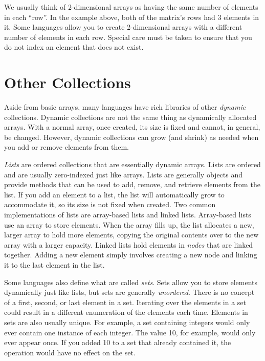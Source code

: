 We usually think of 2-dimensional arrays as having the same number
of elements in each ``row''.  In the example above, both of the matrix's
rows had 3 elements in it.  Some languages allow you to create
2-dimensional arrays with a different number of elements in each
row.  Special care must be taken to ensure that you do not index an 
element that does not exist.

\section{Other Collections}

Aside from basic arrays, many languages have rich libraries of other
\emph{dynamic} collections.  Dynamic collections are not the same
thing as dynamically allocated arrays.  With a normal array, once 
created, its size is fixed and cannot, in general, be changed.  However,
dynamic collections can grow (and shrink) as needed when you 
add or remove elements from them.

\emph{Lists} are ordered collections that are essentially dynamic arrays.  
Lists are ordered and are usually zero-indexed just like arrays.  Lists
are generally objects and provide methods that can be used to add, 
remove, and retrieve elements from the list.  If you add an element
to a list, the list will automatically grow to accommodate it, so its size
is not fixed when created.  Two common implementations of lists are
array-based lists and linked lists.  Array-based lists use an array to
store elements.  When the array fills up, the list allocates a new, 
larger array to hold more elements, copying the original contents
over to the new array with a larger capacity.  Linked lists hold elements
in \emph{nodes} that are linked together.  Adding a new element
simply involves creating a new node and linking it to the last element
in the list.

Some languages also define what are called \emph{sets}.  Sets allow
you to store elements dynamically just like lists, but sets are generally
\emph{unordered}.  There is no concept of a first, second, or last 
element in a set.  Iterating over the elements in a set could result
in a different enumeration of the elements each time.  Elements in
sets are also usually unique.  For example, a set containing integers
would only ever contain one instance of each integer.  The value 10,
for example, would only ever appear once.  If you added 10 to a set
that already contained it, the operation would have no effect on the
set.

